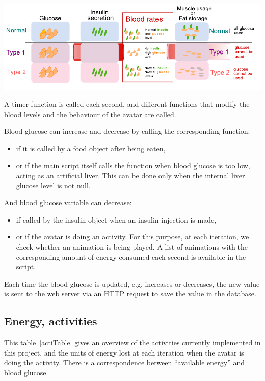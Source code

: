 \includegraphics{diabetes_drawing}

A timer function is called each second, and different functions that modify the blood levels and the behaviour of the avatar are called.

Blood glucose can increase and decrease by calling the corresponding function: 
\begin{itemize}
\item if it is called by a food object after being eaten, 
\item or if the main script itself calls the function when blood glucose is too low, acting as an artificial liver. This can be done only when the internal liver glucose level is not null.
\end{itemize}


And blood glucose variable can decrease:
\begin{itemize}
\item if called by the insulin object when an insulin injection is made, 
\item or if the avatar is doing an activity. For this purpose, at each iteration, we check whether an animation is being played. A list of animations with the corresponding amount of energy consumed each second is available in the script. 
\end{itemize}

Each time the blood glucose is updated, e.g. increases or decreases, the new value is sent to the web server via an HTTP request to save the value in the database. 

\subsection{Energy, activities}
This table~\ref{actiTable} gives an overview of the activities currently implemented in this project, and the units of energy lost at each iteration when the avatar is doing the activity. There is a correspondence between ``available energy'' and blood glucose.

